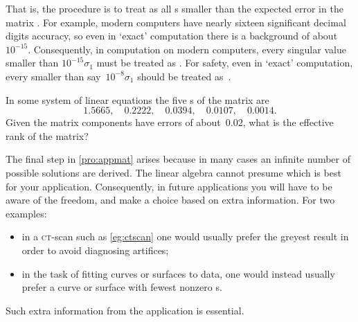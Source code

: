 That is, the procedure is to treat as  all s smaller than the expected error in the matrix .
For example, modern computers have nearly sixteen significant decimal digits accuracy, so even in `exact' computation there is a background  of about~\(10^{-15}\).
Consequently, in computation on modern computers, every singular value smaller than \(10^{-15}\sigma_1\) must be treated as .
For safety, even in `exact' computation, every  smaller than say~\(10^{-8}\sigma_1\) should be treated as~.


\begin{activity}
In some system of linear equations the five s of the matrix are
\begin{equation*}
1.5665,\quad
0.2222,\quad
0.0394,\quad
0.0107,\quad
0.0014.
\end{equation*}
Given the matrix components have errors of about~\(0.02\), what is the effective rank of the matrix?
\end{activity}

The final step in \cref{pro:appmat} arises because in many cases an infinite number of possible solutions are derived.
The linear algebra cannot presume which is best for your application.
Consequently, in future applications you will have to be aware of the freedom, and make a choice based on extra information.
For two examples:
\begin{itemize}
\item in a \textsc{ct}-scan such as \cref{eg:ctscan} one would usually prefer the greyest result in order to avoid diagnosing artifices;
\item in the  task of fitting curves or surfaces to data, one would instead usually prefer a curve or surface with fewest nonzero s.
\end{itemize}
Such extra information from the application is essential. 





